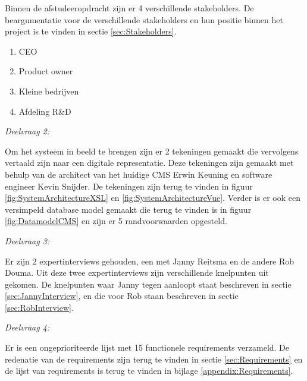 \whitespace
Binnen de afstudeeropdracht zijn er 4 verschillende stakeholders.
De beargumentatie voor de verschillende stakeholders en hun positie binnen het project is te vinden in sectie \ref{sec:Stakeholders}.
\begin{enumerate}
    \item{CEO}
    \item{Product owner}
    \item{Kleine bedrijven}
    \item{Afdeling R\&D}
\end{enumerate}

\begin{center}
	\textit{Deelvraag 2: \SubquestionTwo}
\end{center}

\whitespace
Om het systeem in beeld te brengen zijn er 2 tekeningen gemaakt die vervolgens vertaald zijn naar een digitale representatie.
Deze tekeningen zijn gemaakt met behulp van de architect van het huidige CMS Erwin Keuning en software engineer Kevin Snijder.
De tekeningen zijn terug te vinden in figuur \ref{fig:SystemArchitectureXSL} en \ref{fig:SystemArchitectureVue}.
Verder is er ook een versimpeld database model gemaakt die terug te vinden is in figuur \ref{fig:DatamodelCMS} en zijn er 5 randvoorwaarden opgesteld.

\begin{center}
	\textit{Deelvraag 3: \SubquestionThree}
\end{center}

\whitespace
Er zijn 2 expertinterviews gehouden, een met Janny Reitsma en de andere Rob Douma.
Uit deze twee expertinterviews zijn verschillende knelpunten uit gekomen.
De knelpunten waar Janny tegen aanloopt staat beschreven in sectie \ref{sec:JannyInterview}, en die voor Rob staan beschreven in sectie \ref{sec:RobInterview}.

\begin{center}
	\textit{Deelvraag 4: \SubquestionFour}
\end{center}

\whitespace
Er is een ongeprioriteerde lijst met 15 functionele requirements verzameld.
De redenatie van de requirements zijn terug te vinden in sectie \ref{sec:Requirements} en de lijst van requirements is terug te vinden in bijlage \ref{appendix:Requirements}.

